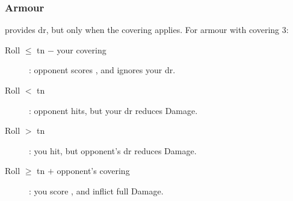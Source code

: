 \subsubsection{Armour}
provides \gls{dr}, but only when the \gls{covering} applies.
For armour with \gls{covering} 3:

\begin{description}
  \item[Roll $\leq$ \gls{tn} $-$ your \gls{covering}]: opponent scores , and ignores your \gls{dr}.
  \item[Roll $<$ \gls{tn}]: opponent hits, but your \gls{dr} reduces Damage.
  \item[Roll $>$ \gls{tn}]: you hit, but opponent's \gls{dr} reduces Damage.
  \item[Roll $\geq$ \gls{tn} $+$ opponent's \gls{covering}]: you score , and inflict full Damage.
\end{description}
